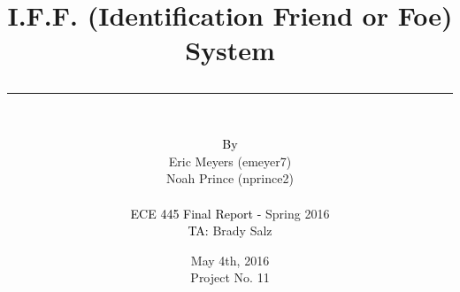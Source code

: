 \documentclass[letterpaper,10pt]{article}
\author{\vspace{.4in}\\
	\textcolor{black}{By}\\
	#1
	\vspace{1in}\\
	\textcolor{black}{ECE 445 Final Report -} #2\\
	\textcolor{black}{TA:} #3
	\vspace{1in}}
\newcommand{\thetitle}[1]{\title{\begin{huge}{\bf #1}\end{huge} \color{subtitlecolor}\rule[25pt]{\textwidth}{1pt}}}
\newcommand{\theauthor}[3]{
	\author{\vspace{.4in}\\
	\textcolor{black}{By}\\
	#1
	\vspace{1in}\\
	\textcolor{black}{ECE 445 Final Report -} #2\\
	\textcolor{black}{TA:} #3
	\vspace{1in}}
}
\begin{document}
\pagestyle{empty}
\doublespacing

\thetitle{{I.F.F. (Identification Friend or Foe) System}}

\theauthor{
	{Eric Meyers (emeyer7)}\\
	{Noah Prince (nprince2)}\\
}
{ %
	{Spring 2016}
}
{ %
	{Brady Salz}
}

\date{
{May 4th, 2016}\\
Project No. 11
\clearpage
}
\end{document}
